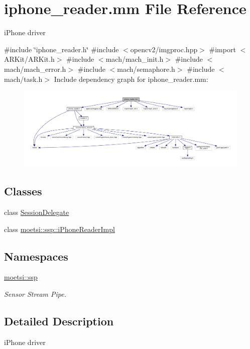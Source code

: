 \hypertarget{iphone__reader_8mm}{}\section{iphone\+\_\+reader.\+mm File Reference}
\label{iphone__reader_8mm}


i\+Phone driver  


{\ttfamily \#include \char`\"{}iphone\+\_\+reader.\+h\char`\"{}}\newline
{\ttfamily \#include $<$opencv2/imgproc.\+hpp$>$}\newline
{\ttfamily \#import $<$A\+R\+Kit/\+A\+R\+Kit.\+h$>$}\newline
{\ttfamily \#include $<$mach/mach\+\_\+init.\+h$>$}\newline
{\ttfamily \#include $<$mach/mach\+\_\+error.\+h$>$}\newline
{\ttfamily \#include $<$mach/semaphore.\+h$>$}\newline
{\ttfamily \#include $<$mach/task.\+h$>$}\newline
Include dependency graph for iphone\+\_\+reader.\+mm\+:\nopagebreak
\begin{figure}[H]
\begin{center}
\leavevmode
\includegraphics[width=350pt]{iphone__reader_8mm__incl}
\end{center}
\end{figure}
\subsection*{Classes}
\begin{DoxyCompactItemize}
\item 
class \hyperlink{interfaceSessionDelegate}{Session\+Delegate}
\item 
class \hyperlink{classmoetsi_1_1ssp_1_1iPhoneReaderImpl}{moetsi\+::ssp\+::i\+Phone\+Reader\+Impl}
\end{DoxyCompactItemize}
\subsection*{Namespaces}
\begin{DoxyCompactItemize}
\item 
 \hyperlink{namespacemoetsi_1_1ssp}{moetsi\+::ssp}
\begin{DoxyCompactList}\small\item\em Sensor Stream Pipe. \end{DoxyCompactList}\end{DoxyCompactItemize}


\subsection{Detailed Description}
i\+Phone driver 

